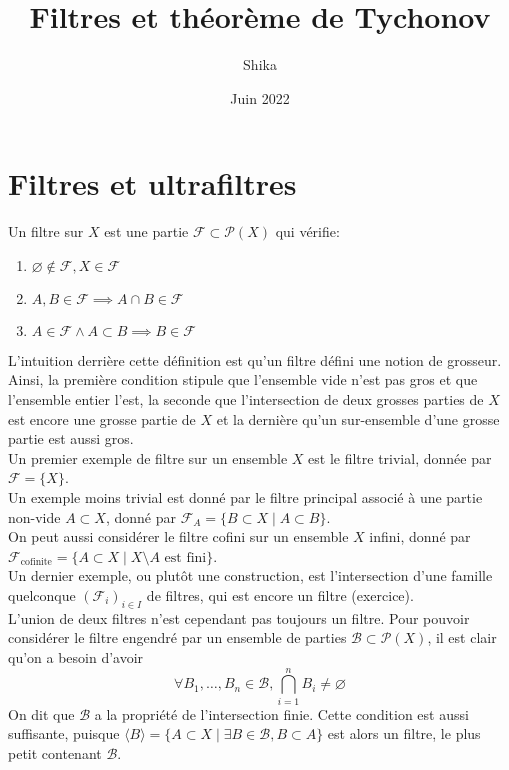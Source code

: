 \documentclass{article}
\title{Filtres et théorème de Tychonov}
\author{Shika}
\date{Juin 2022}
\begin{document}
\maketitle


\section{Filtres et ultrafiltres}
\begin{definition}
    Un filtre sur $X$ est une partie $\mathcal{F} \subset \mathcal{P}(X)$ qui vérifie:
    \begin{enumerate}
        \item $\varnothing \not\in \mathcal{F}, X \in \mathcal{F}$
        \item $A, B \in \mathcal{F} \implies A \cap B \in \mathcal{F}$
        \item $A \in \mathcal{F} \land A \subset B \implies B \in \mathcal{F}$
    \end{enumerate}
\end{definition}

L'intuition derrière cette définition est qu'un filtre défini une notion de grosseur.\\
Ainsi, la première condition stipule que l'ensemble vide n'est pas gros et que l'ensemble entier l'est, la seconde que l'intersection de deux grosses parties de $X$ est encore une grosse partie de $X$ et la dernière qu'un sur-ensemble d'une grosse partie est aussi gros.\\

Un premier exemple de filtre sur un ensemble $X$ est le filtre trivial, donnée par $\mathcal{F} = \{X\}$.\\ Un exemple moins trivial est donné par le filtre principal associé à une partie non-vide $A \subset X$, donné par $\mathcal{F}_A = \{B \subset X \mid A \subset B\}$.\\
On peut aussi considérer le filtre cofini sur un ensemble $X$ infini, donné par $\mathcal{F}_{\text{cofinite}} = \{A \subset X \mid X\setminus A \text{ est fini}\}$.\\
Un dernier exemple, ou plutôt une construction, est l'intersection d'une famille quelconque $(\mathcal{F}_i)_{i \in I}$ de filtres, qui est encore un filtre (exercice).\\
L'union de deux filtres n'est cependant pas toujours un filtre.
Pour pouvoir considérer le filtre engendré par un ensemble de parties $\mathcal{B} \subset \mathcal{P}(X)$, il est clair qu'on a besoin d'avoir
$$\forall B_1, \ldots, B_n \in \mathcal{B}, \bigcap_{i=1}^{n}{B_i} \neq \varnothing$$
On dit que $\mathcal{B}$ a la propriété de l'intersection finie. Cette condition est aussi suffisante, puisque $\langle B \rangle = \{A \subset X \mid \exists B \in \mathcal{B}, B \subset A\}$ est alors un filtre, le plus petit contenant $\mathcal{B}$.
\end{document}
